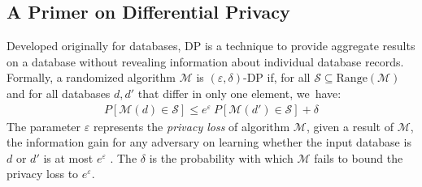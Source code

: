\subsection{A Primer on Differential Privacy}
\label{subsec:DP-background}
Developed originally for databases, DP is a technique to provide aggregate
results on a database without revealing information about individual database
records.
%
Formally, a randomized algorithm $\mathcal{M}$
is $(\varepsilon, \delta)$-DP
if, for all $\mathcal{S} \subseteq \textrm{Range}(\mathcal{M})$ and for all
databases $d, d'$ that differ in only one element, we~have:
\begin{align}
    \label{eq:dp}
    P[\mathcal{M}(d)\in \mathcal{S}] \leq e^{\varepsilon}~P[\mathcal{M}(d')
    \in \mathcal{S}] + \delta
\end{align}
The parameter $\varepsilon$ represents the {\em privacy loss} of algorithm
$\mathcal{M}$, \ie given a
result of $\mathcal{M}$, the information gain for any adversary on learning
whether the input database is $d$ or $d'$ is at most $e^{\varepsilon}$
\cite{kasiviswanathan2014semantics}.
The $\delta$ is the probability with which $\mathcal{M}$ fails to bound the
privacy loss to $e^{\varepsilon}$.

